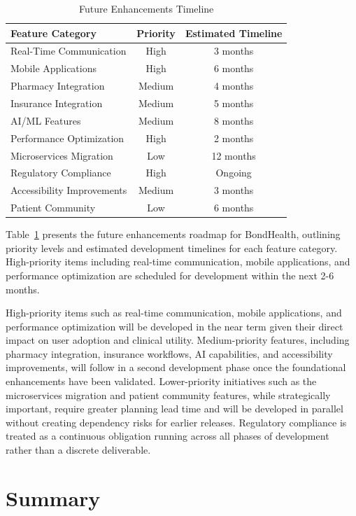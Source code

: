 \begin{table}[H]
\centering
\caption{Future Enhancements Timeline}
\label{tab:timeline}
\begin{tabular}{|l|c|c|}
\hline
\textbf{Feature Category} & \textbf{Priority} & \textbf{Estimated Timeline} \\
\hline
Real-Time Communication & High & 3 months \\
\hline
Mobile Applications & High & 6 months \\
\hline
Pharmacy Integration & Medium & 4 months \\
\hline
Insurance Integration & Medium & 5 months \\
\hline
AI/ML Features & Medium & 8 months \\
\hline
Performance Optimization & High & 2 months \\
\hline
Microservices Migration & Low & 12 months \\
\hline
Regulatory Compliance & High & Ongoing \\
\hline
Accessibility Improvements & Medium & 3 months \\
\hline
Patient Community & Low & 6 months \\
\hline
\end{tabular}
\end{table}
\noindent Table~\ref{tab:timeline} presents the future enhancements roadmap for BondHealth, outlining priority levels and estimated development timelines for each feature category. High-priority items including real-time communication, mobile applications, and performance optimization are scheduled for development within the next 2-6 months.

\noindent High-priority items such as real-time communication, mobile applications, and performance optimization will be developed in the near term given their direct impact on user adoption and clinical utility. Medium-priority features, including pharmacy integration, insurance workflows, AI capabilities, and accessibility improvements, will follow in a second development phase once the foundational enhancements have been validated. Lower-priority initiatives such as the microservices migration and patient community features, while strategically important, require greater planning lead time and will be developed in parallel without creating dependency risks for earlier releases. Regulatory compliance is treated as a continuous obligation running across all phases of development rather than a discrete deliverable.

\section{Summary}

